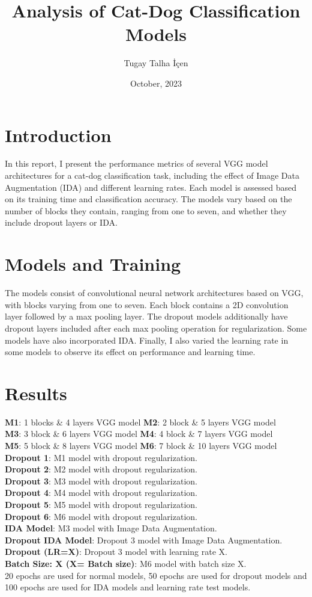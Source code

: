 \documentclass{article}
\begin{document}
\title{Analysis of Cat-Dog Classification Models}
\author{Tugay Talha İçen}
\date{October, 2023}


\section{Introduction}
In this report, I present the performance metrics of several VGG model architectures for a cat-dog classification task, including the effect of Image Data Augmentation (IDA) and different learning rates. Each model is assessed based on its training time and classification accuracy. The models vary based on the number of blocks they contain, ranging from one to seven, and whether they include dropout layers or IDA.

\section{Models and Training}
The models consist of convolutional neural network architectures based on VGG, with blocks varying from one to seven. Each block contains a 2D convolution layer followed by a max pooling layer. The dropout models additionally have dropout layers included after each max pooling operation for regularization. Some models have also incorporated IDA. Finally, I also varied the learning rate in some models to observe its effect on performance and learning time.

\section{Results}

\textbf{M1}: 1 blocks \& 4 layers VGG model 
\textbf{M2}: 2 block \& 5 layers VGG model
\\\textbf{M3}: 3 block \& 6 layers VGG model 
\textbf{M4}: 4 block \& 7 layers VGG model
\\\textbf{M5}: 5 block \& 8 layers VGG model 
\textbf{M6}: 7 block \& 10 layers VGG model
\\\textbf{Dropout 1}: M1 model with dropout regularization. 
\\\textbf{Dropout 2}: M2 model with dropout regularization.
\\\textbf{Dropout 3}: M3 model with dropout regularization. 
\\\textbf{Dropout 4}: M4 model with dropout regularization.
\\\textbf{Dropout 5}: M5 model with dropout regularization. 
\\\textbf{Dropout 6}: M6 model with dropout regularization.
\\\textbf{IDA Model}: M3 model with Image Data Augmentation.
\\\textbf{Dropout IDA Model}: Dropout 3 model with Image Data Augmentation.
\\\textbf{Dropout (LR=X)}: Dropout 3 model with learning rate X.
\\\textbf{Batch Size: X (X= Batch size)}: M6 model with batch size X.
\\20 epochs are used for normal models, 50 epochs are used for dropout models and 100 epochs are used for IDA models and learning rate test models.
\end{document}
